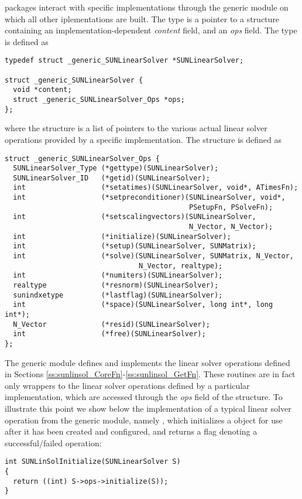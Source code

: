 {\sundials} packages interact with specific {\sunlinsol} implementations
through the generic {\sunlinsol} module on which all other {\sunlinsol}
iplementations are built.  The  type is a pointer
to a structure containing an implementation-dependent \emph{content} field,
and an \emph{ops} field.  The type  is defined as
\begin{verbatim}
typedef struct _generic_SUNLinearSolver *SUNLinearSolver;

struct _generic_SUNLinearSolver {
  void *content;
  struct _generic_SUNLinearSolver_Ops *ops;
};
\end{verbatim}
where the  structure is a list of
pointers to the various actual linear solver operations provided by a
specific implementation.  The 
structure is defined as
\begin{verbatim}
struct _generic_SUNLinearSolver_Ops {
  SUNLinearSolver_Type (*gettype)(SUNLinearSolver);
  SUNLinearSolver_ID   (*getid)(SUNLinearSolver);
  int                  (*setatimes)(SUNLinearSolver, void*, ATimesFn);
  int                  (*setpreconditioner)(SUNLinearSolver, void*,
                                            PSetupFn, PSolveFn);
  int                  (*setscalingvectors)(SUNLinearSolver,
                                            N_Vector, N_Vector);
  int                  (*initialize)(SUNLinearSolver);
  int                  (*setup)(SUNLinearSolver, SUNMatrix);
  int                  (*solve)(SUNLinearSolver, SUNMatrix, N_Vector,
                                N_Vector, realtype);
  int                  (*numiters)(SUNLinearSolver);
  realtype             (*resnorm)(SUNLinearSolver);
  sunindxetype         (*lastflag)(SUNLinearSolver);
  int                  (*space)(SUNLinearSolver, long int*, long int*);
  N_Vector             (*resid)(SUNLinearSolver);
  int                  (*free)(SUNLinearSolver);
};
\end{verbatim}

The generic {\sunlinsol} module defines and implements the linear
solver operations defined in Sections
\ref{ss:sunlinsol_CoreFn}-\ref{ss:sunlinsol_GetFn}.  These routines
are in fact only wrappers to the linear solver operations
defined by a particular {\sunlinsol} implementation, which are
accessed through the {\em ops} field of the 
structure. To illustrate this point we show below the implementation
of a typical linear solver operation from the generic {\sunlinsol}
module, namely , which initializes a
{\sunlinsol} object for use after it has been created and configured,
and returns a flag denoting a successful/failed operation:
\begin{verbatim}
int SUNLinSolInitialize(SUNLinearSolver S)
{
  return ((int) S->ops->initialize(S));
}
\end{verbatim}

